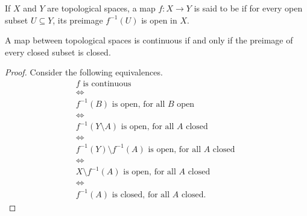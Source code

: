 \begin{definition}[Continuity]
	If $ X $ and $ Y $ are topological spaces, a map $ f: X \to Y $ is said to be  if for every open subset $ U \subseteq Y $, its preimage $ f ^{-1}( U ) $ is open in $ X $.
\end{definition}

\begin{proposition}
	A map between topological spaces is continuous if and only if the preimage of every closed subset is closed.
	\begin{proof}
		Consider the following equivalences.
		\begin{gather*}
			f \text{ is continuous }\\
			\iff \\
			f ^{-1}( B ) \text{ is open, for all } B \text{ open }\\
			\iff \\
			f ^{-1}( Y \setminus A ) \text{ is open, for all } A \text{ closed }\\
			\iff \\
			f ^{-1}( Y )\setminus f ^{-1}( A ) \text{ is open, for all } A \text{ closed }\\
			\iff \\
			X \setminus f ^{-1}( A )\text{ is open, for all } A \text{ closed }\\
			\iff \\
			f ^{-1}( A ) \text{ is closed, for all } A \text{ closed}.
		\end{gather*}
	\end{proof}
\end{proposition}

